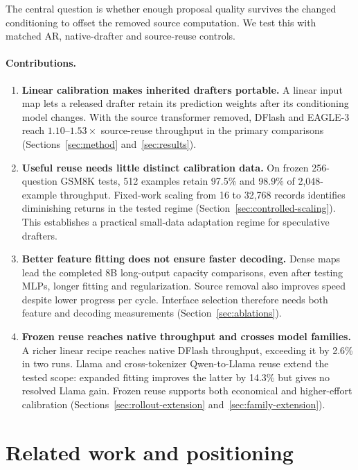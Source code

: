 \documentclass{article}
\begin{document}
The central question is whether enough proposal quality survives the
changed conditioning to offset the removed source computation. We test
this with matched AR, native-drafter and source-reuse controls.

\paragraph{Contributions.}
\label{sec:contributions}
\begin{enumerate}
\item \textbf{Linear calibration makes inherited drafters portable.}
A linear input map lets a released drafter retain its prediction weights
after its conditioning model changes. With the source transformer removed,
DFlash and
EAGLE-3 reach $1.10$--$1.53\times$ source-reuse throughput in the primary
comparisons (Sections~\ref{sec:method} and~\ref{sec:results}).
\item \textbf{Useful reuse needs little distinct calibration data.}
On frozen 256-question GSM8K tests, 512 examples retain 97.5\% and
98.9\% of 2,048-example throughput. Fixed-work scaling from 16 to
32,768 records identifies diminishing returns in the tested regime
(Section~\ref{sec:controlled-scaling}). This establishes a practical
small-data adaptation regime for speculative drafters.
\item \textbf{Better feature fitting does not ensure faster decoding.}
Dense maps lead the completed 8B long-output capacity comparisons,
even after testing MLPs, longer fitting and regularization. Source
removal also improves speed despite lower progress per cycle.
Interface selection therefore needs both feature and decoding measurements
(Section~\ref{sec:ablations}).
\item \textbf{Frozen reuse reaches native throughput and crosses model families.}
A richer linear recipe reaches native DFlash throughput, exceeding it
by 2.6\% in two runs. Llama and cross-tokenizer Qwen-to-Llama reuse
extend the tested scope: expanded fitting improves the latter by 14.3\%
but gives no resolved Llama gain. Frozen reuse supports both economical
and higher-effort calibration
(Sections~\ref{sec:rollout-extension} and~\ref{sec:family-extension}).
\end{enumerate}

\section{Related work and positioning}
\label{sec:related}
\end{document}
